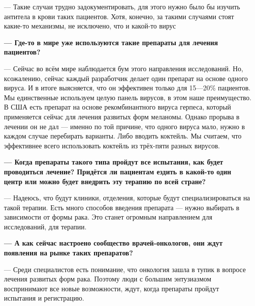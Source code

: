 — Такие случаи трудно задокументировать, для этого нужно было бы изучить антитела в крови таких пациентов. Хотя, конечно, за такими случаями стоят какие-то механизмы, не исключено, что и какой-то вирус

{\bf — Где-то в мире уже используются такие препараты для лечения пациентов? }

— Сейчас во всём мире наблюдается бум этого направления исследований. Но, ксожалению, сейчас каждый разработчик делает один препарат на основе одного вируса. И в итоге выясняется, что он эффективен только для 15—20\% пациентов. Мы единственные используем целую панель вирусов, в этом наше преимущество. В США есть препарат на основе рекомбинантного вируса герпеса, который применяется сейчас для лечения развитых форм меланомы. Однако прорыва в лечении он не дал — именно по той причине, что одного вируса мало, нужно в каждом случае перебирать варианты. Либо вводить коктейль. Мы считаем, что эффективнее всего использовать коктейль из трёх-пяти разных вирусов.

{\bf — Когда препараты такого типа пройдут все испытания, как будет проводиться лечение? Придётся ли пациентам ездить в какой-то один центр или можно будет внедрить эту терапию по всей стране?}

— Надеюсь, что будут клиники, отделения, которые будут специализироваться на такой терапии. Есть много способов введения препарата — нужно выбирать в зависимости от формы рака. Это станет огромным направлением для исследований, для терапии.

{\bf — А как сейчас настроено сообщество врачей-онкологов, они ждут появления на рынке таких препаратов? }

— Среди специалистов есть понимание, что онкология зашла в тупик в вопросе лечения развитых форм рака. Поэтому люди с большим энтузиазмом воспринимают все новые возможности, ждут, когда препараты пройдут испытания и регистрацию.


